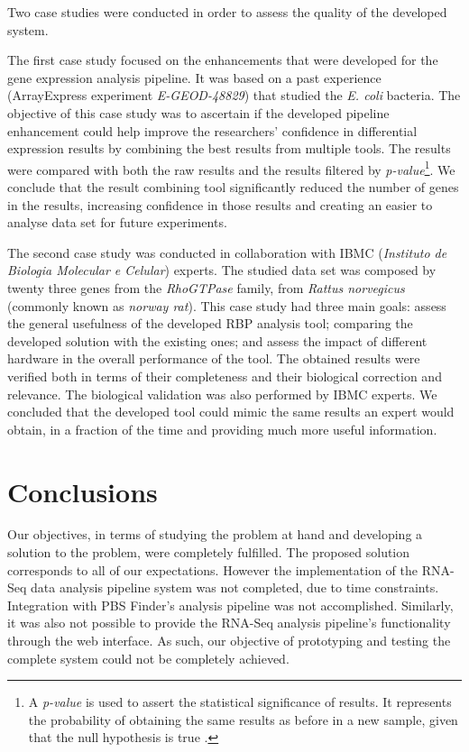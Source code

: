 \documentclass[9pt,a4paper]{extarticle}
\begin{document}
\begin{multicols}{2}
Two case studies were conducted in order to assess the quality of the developed
system.

The first case study focused on the enhancements that were developed for the
gene expression analysis pipeline. It was based on a past experience
(ArrayExpress experiment \emph{E-GEOD-48829}) that studied the \emph{E. coli}
bacteria. The objective of this case study was to ascertain if the developed
pipeline enhancement could help improve the researchers' confidence in
differential expression results by combining the best results from multiple
tools. The results were compared with both the raw results and the results
filtered by \emph{p-value}\footnote{A \emph{p-value} is used to assert the
statistical significance of results. It represents the probability of obtaining
the same results as before in a new sample, given that the null hypothesis is
true \cite{goodman45dirty}.}. We conclude that the result combining tool
significantly reduced the number of genes in the results, increasing confidence
in those results and creating an easier to analyse data set for future
experiments.

The second case study was conducted in collaboration with IBMC (\emph{Instituto
de Biologia Molecular e Celular}) experts. The studied data set was composed by
twenty three genes from the \emph{RhoGTPase} family, from \emph{Rattus
norvegicus} (commonly known as \emph{norway rat}). This case study had three
main goals: assess the general usefulness of the developed RBP analysis tool;
comparing the developed solution with the existing ones; and assess the impact
of different hardware in the overall performance of the tool. The obtained
results were verified both in terms of their completeness and their biological
correction and relevance. The biological validation was also performed by IBMC
experts. We concluded that the developed tool could mimic the same results an
expert would obtain, in a fraction of the time and providing much more useful
information.

\section{Conclusions}

Our objectives, in terms of studying the problem at hand and developing a
solution to the problem, were completely fulfilled. The proposed solution
corresponds to all of our expectations. However the implementation of the
RNA-Seq data analysis pipeline system was not completed, due to time
constraints. Integration with PBS Finder's analysis pipeline was not
accomplished. Similarly, it was also not possible to provide the RNA-Seq
analysis pipeline's functionality through the web interface. As such, our
objective of prototyping and testing the complete system could not be completely
achieved.


\end{multicols}
\end{document}

